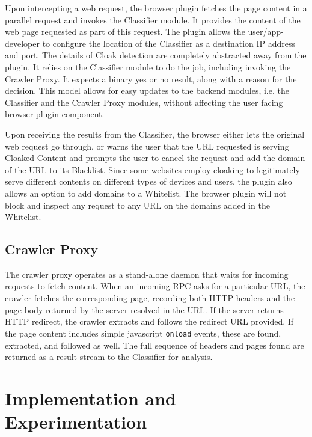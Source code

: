 \documentclass[letterpaper,twocolumn,10pt]{article}
\begin{document}

Upon intercepting a web request, the browser plugin fetches the page content in a parallel request and invokes the Classifier module. It provides the content of the web page requested as part of this request. The plugin allows the user/app-developer to configure the location of the Classifier as a destination IP address and port. The details of Cloak detection are completely abstracted away from the plugin. It relies on the Classifier module to do the job, including invoking the Crawler Proxy. It expects a binary yes or no result, along with a reason for the decision. This model allows for easy updates to the backend modules, i.e. the Classifier and the Crawler Proxy modules, without affecting the user facing browser plugin component.

Upon receiving the results from the Classifier, the browser either lets the original web request go through, or warns the user that the URL requested is serving Cloaked Content and prompts the user to cancel the request and add the domain of the URL to its Blacklist. Since some websites employ cloaking to legitimately serve different contents on different types of devices and users, the plugin also allows an option to add domains to a Whitelist. The browser plugin will not block and inspect any request to any URL on the domains added in the Whitelist.

\subsection{Crawler Proxy}
The crawler proxy operates as a stand-alone daemon that waits for incoming requests to fetch content.  When an incoming RPC asks for a particular URL, the crawler fetches the corresponding page, recording both HTTP headers and the page body returned by the server resolved in the URL.  If the server returns HTTP redirect, the crawler extracts and follows the redirect URL provided.  If the page content includes simple javascript \texttt{onload} events, these are found, extracted, and followed as well.  The full sequence of headers and pages found are returned as a result stream to the Classifier for analysis.

\section{Implementation and Experimentation}
\end{document}
